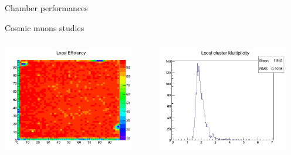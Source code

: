 \documentclass[10pt]{beamer}
\begin{document}
\begin{frame}{Chamber performances  }
  \begin{block}{ Cosmic muons studies}
    \begin{columns}

      \begin{column}{0.5\textwidth}
        \centerline{\includegraphics[width=0.9\textwidth]{jpg/LocalEfficiency}}
      \end{column}
      \begin{column}{0.5\textwidth}
        \centerline{\includegraphics[width=0.9\textwidth]{jpg/LocalMultiplicity}}
      \end{column}
    \end{columns}
  \end{block}

\end{frame}
\end{document}
